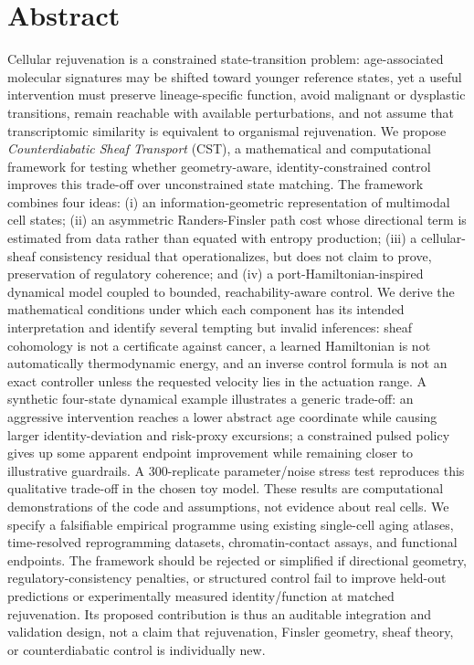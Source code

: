 \documentclass[11pt,a4paper]{article}
\theoremstyle{definition}
\theoremstyle{remark}
\begin{document}
\section*{Abstract}
Cellular rejuvenation is a constrained state-transition problem: age-associated molecular signatures may be shifted toward younger reference states, yet a useful intervention must preserve lineage-specific function, avoid malignant or dysplastic transitions, remain reachable with available perturbations, and not assume that transcriptomic similarity is equivalent to organismal rejuvenation. We propose \emph{Counterdiabatic Sheaf Transport} (CST), a mathematical and computational framework for testing whether geometry-aware, identity-constrained control improves this trade-off over unconstrained state matching. The framework combines four ideas: (i) an information-geometric representation of multimodal cell states; (ii) an asymmetric Randers-Finsler path cost whose directional term is estimated from data rather than equated with entropy production; (iii) a cellular-sheaf consistency residual that operationalizes, but does not claim to prove, preservation of regulatory coherence; and (iv) a port-Hamiltonian-inspired dynamical model coupled to bounded, reachability-aware control. We derive the mathematical conditions under which each component has its intended interpretation and identify several tempting but invalid inferences: sheaf cohomology is not a certificate against cancer, a learned Hamiltonian is not automatically thermodynamic energy, and an inverse control formula is not an exact controller unless the requested velocity lies in the actuation range. A synthetic four-state dynamical example illustrates a generic trade-off: an aggressive intervention reaches a lower abstract age coordinate while causing larger identity-deviation and risk-proxy excursions; a constrained pulsed policy gives up some apparent endpoint improvement while remaining closer to illustrative guardrails. A 300-replicate parameter/noise stress test reproduces this qualitative trade-off in the chosen toy model. These results are computational demonstrations of the code and assumptions, not evidence about real cells. We specify a falsifiable empirical programme using existing single-cell aging atlases, time-resolved reprogramming datasets, chromatin-contact assays, and functional endpoints. The framework should be rejected or simplified if directional geometry, regulatory-consistency penalties, or structured control fail to improve held-out predictions or experimentally measured identity/function at matched rejuvenation. Its proposed contribution is thus an auditable integration and validation design, not a claim that rejuvenation, Finsler geometry, sheaf theory, or counterdiabatic control is individually new.
\end{document}
